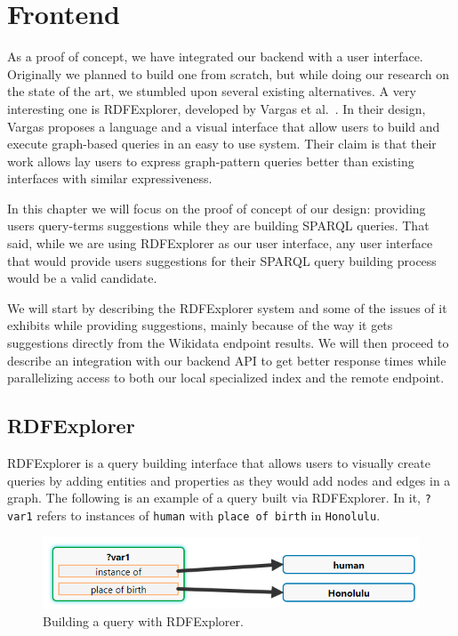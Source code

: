 \chapter{Frontend}
\label{chap:Frontend}

As a proof of concept, we have integrated our backend with a user interface. 
Originally we planned to build one from scratch, but while doing our research on the state of the art, we stumbled upon several existing alternatives. 
A very interesting one is RDFExplorer, developed by Vargas et al.~\cite{Vargas2019}. 
In their design, Vargas proposes a language and a visual interface that allow users to build and execute graph-based queries in an easy to use system. 
Their claim is that their work allows lay users to express graph-pattern queries better than existing interfaces with similar expressiveness. 

In this chapter we will focus on the proof of concept of our design: 
providing users query-terms suggestions while they are building SPARQL queries. 
That said, while we are using RDFExplorer as our user interface, any user interface that would provide users suggestions for their SPARQL query building process would be a valid candidate.

We will start by describing the RDFExplorer system and some of the issues of it exhibits while providing suggestions, mainly because of the way it gets suggestions directly from the Wikidata endpoint results. 
We will then proceed to describe an integration with our backend API to get better response times while parallelizing access to both our local specialized index and the remote endpoint.

\section{RDFExplorer}

RDFExplorer is a query building interface that allows users to visually create queries by adding entities and properties as they would add nodes and edges in a graph. The following is an example of a query built via RDFExplorer. In it, \texttt{?var1} refers to instances of \texttt{human} with \texttt{place of birth} in \texttt{Honolulu}.

\begin{figure}[H]
    \centering
        \includegraphics[width=.8\linewidth]{imagenes/rdfExplorer1.png}
        \caption{Building a query with RDFExplorer.}
        \label{fig:rdfExplorer1}
\end{figure}

